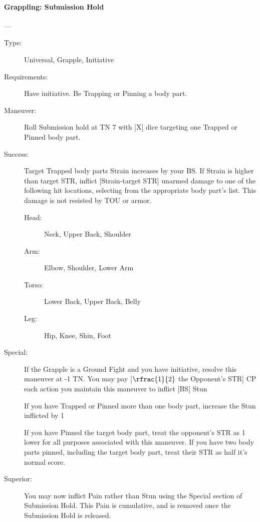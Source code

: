 \paragraph{Grappling: Submission Hold \large} \label{man:grappling-submission-hold}
---\quad {\large [X+1]}
\vspace{-10pt} \begin{description}
\item [Type:] Universal, Grapple, Initiative
\item [Requirements:] Have initiative. Be Trapping or Pinning a body part.
\item [Maneuver:] Roll Submission hold at TN 7 with [X] dice targeting one
  Trapped or Pinned body part. 

\item [Success:] Target Trapped body parts Strain increases by your BS. If
Strain is higher than target STR, inflict [Strain-target STR] unarmed damage
to one of the following hit locations, selecting from the appropriate body
part’s list. This damage is not resisted by TOU or armor. 
  \begin{description}
  \item [Head: ] Neck, Upper Back, Shoulder
  \item [Arm: ] Elbow, Shoulder, Lower Arm
  \item [Torso: ] Lower Back, Upper Back, Belly
  \item [Leg: ] Hip, Knee, Shin, Foot
  \end{description}
\item [Special:] If the Grapple is a Ground Fight and you have initiative,
  resolve this maneuver at -1 TN. You may pay [$\rfrac{1}{2}$ the Opponent’s
  STR] CP each action you maintain this maneuver to inflict [BS] Stun   

If you have Trapped or Pinned more than one body part, increase the Stun
inflicted by 1 

If you have Pinned the target body part, treat the opponent’s STR as 1 lower for
all purposes associated with this maneuver. If you have two body parts pinned,
including the target body part, treat their STR as half it’s normal score. 

\item [ Superior: ]
 You may now inflict Pain rather than Stun using the Special section of
 Submission Hold. This Pain is cumulative, and is removed once the Submission
 Hold is released.  
\end{description}

